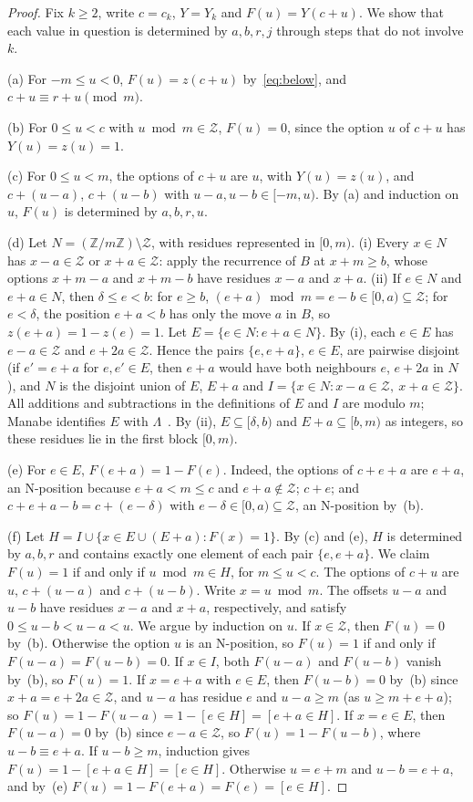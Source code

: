 \documentclass[11pt]{amsart}
\theoremstyle{definition}
\numberwithin{equation}{section}
\newcommand{\Z}{\mathcal{Z}}
\begin{document}
\begin{proof}
Fix $k\ge2$, write $c=c_k$, $Y=Y_k$ and $F(u)=Y(c+u)$. We show that each value in question is
determined by $a,b,r,j$ through steps that do not involve $k$.

(a) For $-m\le u<0$, $F(u)=z(c+u)$ by~\eqref{eq:below}, and $c+u\equiv r+u\pmod m$.

(b) For $0\le u<c$ with $u\bmod m\in\Z$, $F(u)=0$, since the option $u$ of $c+u$ has
$Y(u)=z(u)=1$.

(c) For $0\le u<m$, the options of $c+u$ are $u$, with $Y(u)=z(u)$, and $c+(u-a)$, $c+(u-b)$
with $u-a,u-b\in[-m,u)$. By (a) and induction on $u$, $F(u)$ is determined by $a,b,r,u$.

(d) Let $N=(\mathbb{Z}/m\mathbb{Z})\setminus\Z$, with residues represented in $[0,m)$.
(i) Every $x\in N$ has $x-a\in\Z$ or $x+a\in\Z$: apply the recurrence of $B$ at
$x+m\ge b$, whose options $x+m-a$ and $x+m-b$ have residues $x-a$ and $x+a$.
(ii) If $e\in N$ and $e+a\in N$, then $\delta\le e<b$: for $e\ge b$,
$(e+a)\bmod m=e-b\in[0,a)\subseteq\Z$; for $e<\delta$, the position $e+a<b$ has only the move
$a$ in $B$, so $z(e+a)=1-z(e)=1$. Let $E=\{e\in N:e+a\in N\}$. By (i), each $e\in E$ has
$e-a\in\Z$ and $e+2a\in\Z$. Hence the pairs $\{e,e+a\}$, $e\in E$, are pairwise disjoint (if
$e'=e+a$ for $e,e'\in E$, then $e+a$ would have both neighbours $e$, $e+2a$ in $N$), and $N$
is the disjoint union of $E$, $E+a$ and $I=\{x\in N:x-a\in\Z,\ x+a\in\Z\}$. All additions
and subtractions in the definitions of $E$ and $I$ are modulo $m$; Manabe identifies $E$
with $\Lambda$~\cite[Lemma~22]{Manabe}. By (ii),
$E\subseteq[\delta,b)$ and $E+a\subseteq[b,m)$ as integers, so these residues lie in the
first block $[0,m)$.

(e) For $e\in E$, $F(e+a)=1-F(e)$. Indeed, the options of $c+e+a$ are $e+a$, an N-position
because $e+a<m\le c$ and $e+a\notin\Z$; $c+e$; and $c+e+a-b=c+(e-\delta)$ with
$e-\delta\in[0,a)\subseteq\Z$, an N-position by~(b).

(f) Let $H=I\cup\{x\in E\cup(E+a):F(x)=1\}$. By (c) and (e), $H$ is determined by $a,b,r$
and contains exactly one element of each pair $\{e,e+a\}$. We claim $F(u)=1$ if and only if
$u\bmod m\in H$, for $m\le u<c$. The options of $c+u$ are $u$, $c+(u-a)$ and $c+(u-b)$.
Write $x=u\bmod m$. The offsets $u-a$ and $u-b$ have residues $x-a$ and $x+a$, respectively,
and satisfy $0\le u-b<u-a<u$. We argue by
induction on $u$. If $x\in\Z$, then $F(u)=0$ by~(b). Otherwise the option $u$ is an
N-position, so $F(u)=1$ if and only if $F(u-a)=F(u-b)=0$. If $x\in I$, both $F(u-a)$ and
$F(u-b)$ vanish by~(b), so $F(u)=1$. If $x=e+a$ with $e\in E$, then $F(u-b)=0$ by~(b)
since $x+a=e+2a\in\Z$, and $u-a$ has residue $e$ and $u-a\ge m$ (as $u\ge m+e+a$); so
$F(u)=1-F(u-a)=1-[e\in H]=[e+a\in H]$. If $x=e\in E$, then $F(u-a)=0$ by~(b) since
$e-a\in\Z$, so $F(u)=1-F(u-b)$, where $u-b\equiv e+a$. If $u-b\ge m$, induction gives
$F(u)=1-[e+a\in H]=[e\in H]$. Otherwise $u=e+m$ and $u-b=e+a$, and by~(e)
$F(u)=1-F(e+a)=F(e)=[e\in H]$.


\end{proof}
\end{document}
